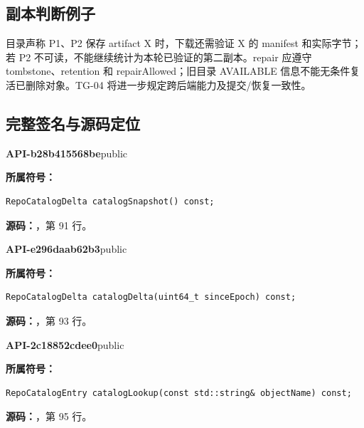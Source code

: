 \subsection{副本判断例子}
目录声称 P1、P2 保存 artifact X 时，下载还需验证 X 的 manifest 和实际字节；若 P2 不可读，不能继续统计为本轮已验证的第二副本。repair 应遵守 tombstone、retention 和 repairAllowed；旧目录 AVAILABLE 信息不能无条件复活已删除对象。TG-04 将进一步规定跨后端能力及提交/恢复一致性。

\subsection{完整签名与源码定位}

\textbf{API-b28b415568be}\quad public\par
\textbf{所属符号：}\par
\begin{Verbatim}[fontsize=\footnotesize,breaklines,breakanywhere]
RepoCatalogDelta catalogSnapshot() const;
\end{Verbatim}
\textbf{源码：}，第 91 行。\par

\textbf{API-e296daab62b3}\quad public\par
\textbf{所属符号：}\par
\begin{Verbatim}[fontsize=\footnotesize,breaklines,breakanywhere]
RepoCatalogDelta catalogDelta(uint64_t sinceEpoch) const;
\end{Verbatim}
\textbf{源码：}，第 93 行。\par

\textbf{API-2c18852cdee0}\quad public\par
\textbf{所属符号：}\par
\begin{Verbatim}[fontsize=\footnotesize,breaklines,breakanywhere]
RepoCatalogEntry catalogLookup(const std::string& objectName) const;
\end{Verbatim}
\textbf{源码：}，第 95 行。\par

